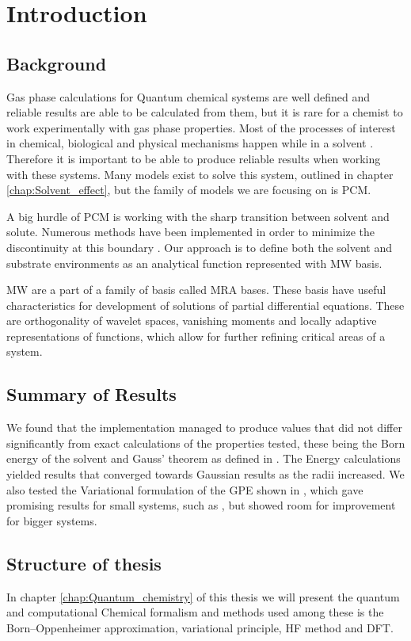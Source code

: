 \documentclass[../master_thesis.tex]{subfiles}
\begin{document}
\chapter{Introduction}
\section{Background}
Gas phase calculations for Quantum chemical systems are well defined and
reliable results are able to be calculated from them, but it is rare for a chemist
to work experimentally with gas phase properties. Most of the processes of interest
in chemical, biological and physical mechanisms happen while in a solvent \cite{FossoTande:2013ka}.
Therefore it is important to be able to produce reliable results when working
with these systems. Many models exist to solve this system, outlined in chapter
\ref{chap:Solvent_effect}, but the family of models we are focusing on is \ac{PCM}.

A big hurdle of \ac{PCM} is working with the sharp transition between solvent and
solute. Numerous methods have been implemented in order to minimize the discontinuity
at this boundary \cite{Tomasi:2005ipa}. Our approach is to define both the solvent
and substrate environments as an analytical function represented with \ac{MW} basis.

\ac{MW} are a part of a family of basis called \ac{MRA} bases. These basis have useful
characteristics for development of solutions of partial differential equations.
These are orthogonality of wavelet spaces, vanishing moments and locally adaptive
representations of functions, which allow for further refining critical areas of a system.


\section{Summary of Results}

We found that the implementation managed to produce values that did not differ
significantly from exact calculations of the properties tested, these being the Born energy of
the solvent \cite{Tomasi:1994wt} and Gauss' theorem as defined in \cite{Sorland}.
The Energy calculations yielded results that converged towards Gaussian results
as the radii increased. We also tested the Variational formulation of the
\ac{GPE} shown in \cite{Lipparini:2010bg}, which gave promising results for
small systems, such as , but showed room for improvement for bigger systems.

\section{Structure of thesis}
In chapter \ref{chap:Quantum_chemistry} of this thesis we will present the quantum
and computational Chemical formalism and methods used among these is the
Born--Oppenheimer approximation, variational principle, \ac{HF} method and
\ac{DFT}.
\end{document}
